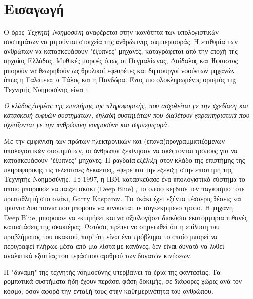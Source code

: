 \chapter{Εισαγωγή}
\label{chapter:intro}

Ο όρος \emph{Τεχνητή Νοημοσύνη} αναφέρεται στην ικανότητα των υπολογιστικών
συστημάτων να μιμούνται στοιχεία της ανθρώπινης συμπεριφοράς.
Η επιθυμία των ανθρώπων να κατασκευάσουν "έξυπνες" μηχανές, καταγράφεται από
την εποχή της αρχαίας Ελλάδας. Μυθικές μορφές όπως οι Πυγμαλίωνας, Δαίδαλος και
Ήφαιστος μπορούν να θεωρηθούν ως θρυλικοί εφευρέτες και δημιουργοί νοούντων
μηχανών όπως η Γαλάτεια, ο Τάλος και η Πανδώρα.
Ένας πιο ολοκληρωμένος ορισμός της Τεχνητής Νοημοσύνης είναι \cite{Goodfellow-et-al-2016-Book}:
\begin{displayquote}
\emph{
  Ο κλάδος/τομέας της επιστήμης της πληροφορικής, που ασχολείται
  με την σχεδίαση και κατασκευή ευφυών συστημάτων, δηλαδή συστημάτων που
  διαθέτουν χαρακτηριστικά που σχετίζονται με την ανθρώπινη νοημοσύνη και συμπεριφορά.
}
\end{displayquote}

Με την εμφάνιση των πρώτων ηλεκτρονικών και (επανα)προγραμματιζόμενων υπολογιστικών συστημάτων,
οι άνθρωποι ξεκίνησαν να σκέφτονται τρόπους για να κατασκευάσουν "έξυπνες" μηχανές.
H ραγδαία εξέλιξη στον κλάδο της επιστήμης της πληροφορικής τις τελευταίες
δεκαετίες, έφερε και την εξέλιξη στην επιστήμη της Τεχνητής Νοημοσύνης.
Το 1997, η IBM κατασκεύασε ένα υπολογιστικό σύστημα το οποίο μπορούσε να
παίξει σκάκι (Deep Blue) \cite{campbell2002deep}, το οποίο κέρδισε τον παγκόσμιο %
τότε πρωταθλητή στο σκάκι, Garry Kasparov. Το σκάκι έχει εξήντα τέσσερις θέσεις
και τριάντα δύο πιόνια που μπορούν να κινούνται με συγκεκριμένο τρόπο. H μηχανή
Deep Blue, μπορούσε να εκτιμήσει και να αξιολογήσει διακόσια εκατομμύρια
πιθανές καταστάσεις της σκακιέρας. Ωστόσο, πρέπει να σημειωθεί ότι η επίλυση του
προβλήματος του σκακιού, παρ' ότι είναι ένα πρόβλημα το οποίο μπορεί να περιγραφεί
πλήρως μέσα από μια λίστα με κανόνες, δεν είναι δυνατό να λυθεί αναλυτικά εξαιτίας
του τεράστιου αριθμού των δυνατών κινήσεων. 

Η "δύναμη" της τεχνητής νοημοσύνης υπερβαίνει τα όρια της φαντασίας.
Τα ρομποτικά συστήματα ήδη έχουν περάσει φάση δοκιμής, σε διάφορες χώρες ανά τον
κόσμο, όσον αφορά την ένταξή τους στην καθημερινότητα του ανθρώπου.

